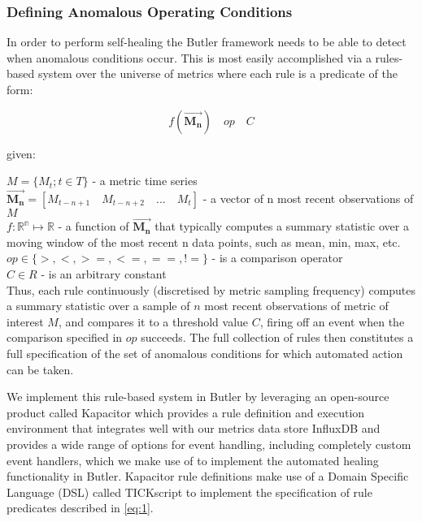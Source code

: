 \subsubsection{Defining Anomalous Operating Conditions}

In order to perform self-healing the Butler framework needs to be able to detect when anomalous conditions occur. This is most easily accomplished via a rules-based system over the universe of metrics where each rule is a predicate of the form:

\begin{equation}\label{eq:1}
    f(\vec{\mathbf{M_n}})\quad op \quad C
\end{equation}

given: 

$M = \{M_t; t \in T\}$ - a metric time series\\
$\vec{\mathbf{M_n}} = [M_{t-n+1} \quad M_{t-n+2} \quad ... \quad M_t]$ - a vector of n most recent observations of $M$\\
$f\colon \mathbb{R^{n}} \mapsto \mathbb{R}$ - a function of $\vec{\mathbf{M_n}}$ that typically computes a summary statistic over a moving window of the most recent n data points, such as mean, min, max, etc.\\
$op \in \{>,<, >=, <=, ==, !=\}$ - is a comparison operator\\
$C \in R$ - is an arbitrary constant\\

Thus, each rule continuously (discretised by metric sampling frequency) computes a summary statistic over a sample of $n$ most recent observations of metric of interest $M$, and compares it to a threshold value $C$, firing off an event when the comparison specified in $op$ succeeds. The full collection of rules then constitutes a full specification of the set of anomalous conditions for which automated action can be taken.

We implement this rule-based system in Butler by leveraging an open-source product called Kapacitor\autocite{kapacitor} which provides a rule definition and execution environment that integrates well with our metrics data store InfluxDB and provides a wide range of options for event handling, including completely custom event handlers, which we make use of to implement the automated healing functionality in Butler. Kapacitor rule definitions make use of a Domain Specific Language (DSL) called TICKscript to implement the specification of rule predicates described in \ref{eq:1}.


